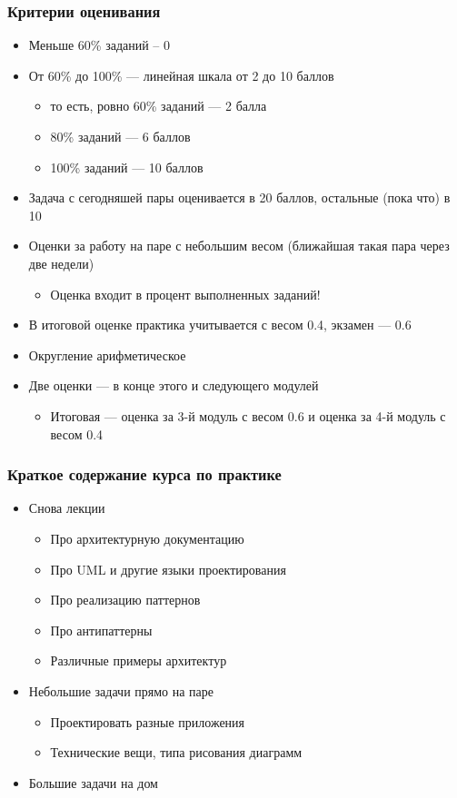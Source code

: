 \documentclass[xetex,mathserif,serif]{beamer}
\begin{document}
	\begin{frame}
		\frametitle{Критерии оценивания}
		\begin{itemize}
			\item Меньше 60\% заданий -- 0
			\item От 60\% до 100\% --- линейная шкала от 2 до 10 баллов
			\begin{itemize}
				\item то есть, ровно 60\% заданий --- 2 балла
				\item 80\% заданий --- 6 баллов
				\item 100\% заданий --- 10 баллов
			\end{itemize}
			\item Задача с сегодняшей пары оценивается в 20 баллов, остальные (пока что) в 10
			\item Оценки за работу на паре с небольшим весом (ближайшая такая пара через две недели)
			\begin{itemize}
				\item Оценка входит в процент выполненных заданий!
			\end{itemize}
			\item В итоговой оценке практика учитывается с весом 0.4, экзамен --- 0.6
			\item Округление арифметическое
			\item Две оценки --- в конце этого и следующего модулей
			\begin{itemize}
				\item Итоговая --- оценка за 3-й модуль с весом 0.6 и оценка за 4-й модуль с весом 0.4
			\end{itemize}
		\end{itemize}
	\end{frame}

	\begin{frame}
		\frametitle{Краткое содержание курса по практике}
		\begin{itemize}
			\item Снова лекции
			\begin{itemize}
				\item Про архитектурную документацию
				\item Про UML и другие языки проектирования
				\item Про реализацию паттернов
				\item Про антипаттерны
				\item Различные примеры архитектур
			\end{itemize}
			\item Небольшие задачи прямо на паре
			\begin{itemize}
				\item Проектировать разные приложения
				\item Технические вещи, типа рисования диаграмм
			\end{itemize}
			\item Большие задачи на дом
		\end{itemize}
	\end{frame}
	
\end{document}
